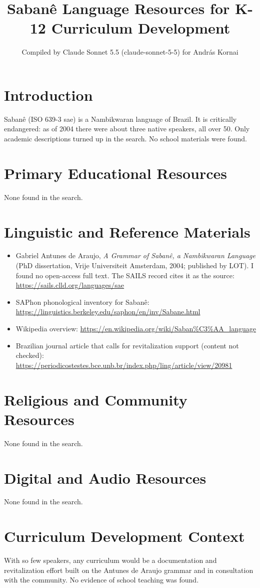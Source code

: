 \documentclass[12pt]{article}
\title{Saban\^e Language Resources for K-12 Curriculum Development}
\author{Compiled by Claude Sonnet 5.5 (claude-sonnet-5-5) for Andr\'as Kornai}
\date{}
\begin{document}
\maketitle

\section{Introduction}
Saban\^e (ISO 639-3 sae) is a Nambikwaran language of Brazil. It is critically endangered: as of 2004 there were about three native speakers, all over 50. Only academic descriptions turned up in the search. No school materials were found.

\section{Primary Educational Resources}
None found in the search.

\section{Linguistic and Reference Materials}
\begin{itemize}
\item Gabriel Antunes de Araujo, \emph{A Grammar of Saban\^e, a Nambikwaran Language} (PhD dissertation, Vrije Universiteit Amsterdam, 2004; published by LOT). I found no open-access full text. The SAILS record cites it as the source: \url{https://sails.clld.org/languages/sae}
\item SAPhon phonological inventory for Saban\^e: \url{https://linguistics.berkeley.edu/saphon/en/inv/Sabane.html}
\item Wikipedia overview: \url{https://en.wikipedia.org/wiki/Saban%C3%AA_language}
\item Brazilian journal article that calls for revitalization support (content not checked): \url{https://periodicostestes.bce.unb.br/index.php/ling/article/view/20981}
\end{itemize}

\section{Religious and Community Resources}
None found in the search.

\section{Digital and Audio Resources}
None found in the search.

\section{Curriculum Development Context}
With so few speakers, any curriculum would be a documentation and revitalization effort built on the Antunes de Araujo grammar and in consultation with the community. No evidence of school teaching was found.
\end{document}
